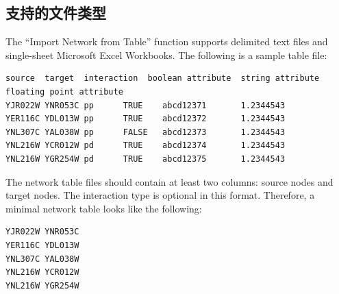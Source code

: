 \subsection{支持的文件类型}
 The ``Import Network from Table'' function supports delimited text files and single-sheet Microsoft Excel Workbooks. The following is a sample table file: 

 \begin{verbatim}
source  target  interaction  boolean attribute  string attribute        floating point attribute
YJR022W YNR053C pp      TRUE    abcd12371       1.2344543
YER116C YDL013W pp      TRUE    abcd12372       1.2344543
YNL307C YAL038W pp      FALSE   abcd12373       1.2344543
YNL216W YCR012W pd      TRUE    abcd12374       1.2344543
YNL216W YGR254W pd      TRUE    abcd12375       1.2344543
\end{verbatim}

 The network table files should contain at least two columns: source nodes and target nodes. The interaction type is optional in this format. Therefore, a minimal network table looks like the following: 

 \begin{verbatim}
YJR022W YNR053C
YER116C YDL013W
YNL307C YAL038W
YNL216W YCR012W
YNL216W YGR254W
\end{verbatim}

